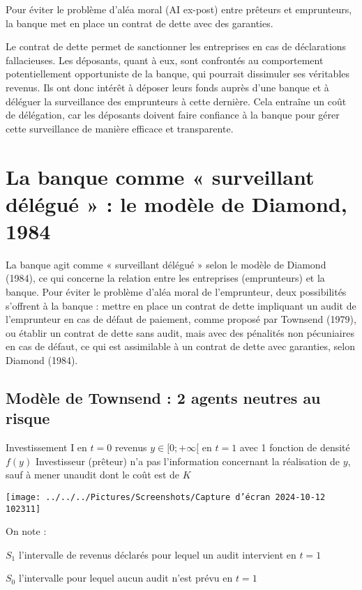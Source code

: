 \documentclass[a4paper, 12pt]{report}
\begin{document}
Pour éviter le problème d'aléa moral (AI ex-post) entre prêteurs et emprunteurs, la banque met en place un contrat de dette avec des garanties.

Le contrat de dette permet de sanctionner les entreprises en cas de déclarations fallacieuses. Les déposants, quant à eux, sont confrontés au comportement potentiellement opportuniste de la banque, qui pourrait dissimuler ses véritables revenus. Ils ont donc intérêt à déposer leurs fonds auprès d'une banque et à déléguer la surveillance des emprunteurs à cette dernière. Cela entraîne un coût de délégation, car les déposants doivent faire confiance à la banque pour gérer cette surveillance de manière efficace et transparente.

\section{La banque comme « surveillant délégué » : le modèle de Diamond, 1984}

La banque agit comme « surveillant délégué » selon le modèle de Diamond (1984), ce qui concerne la relation entre les entreprises (emprunteurs) et la banque. Pour éviter le problème d’aléa moral de l’emprunteur, deux possibilités s'offrent à la banque : mettre en place un contrat de dette impliquant un audit de l’emprunteur en cas de défaut de paiement, comme proposé par Townsend (1979), ou établir un contrat de dette sans audit, mais avec des pénalités non pécuniaires en cas de défaut, ce qui est assimilable à un contrat de dette avec garanties, selon Diamond (1984).

\subsection{Modèle de Townsend : 2 agents neutres au risque}

Investissement I en $t = 0$ revenus $y \in [0;+\infty[$ en $t=1$ avec 1 fonction de densité $f(y)$ Investisseur (prêteur) n’a pas l’information
concernant la réalisation de $y$, sauf à mener unaudit dont le coût est de $K$
\begin{center}
	\texttt{[image: ../../../Pictures/Screenshots/Capture d'écran 2024-10-12 102311]}
\end{center}
On note :

$S_1$ l’intervalle de revenus déclarés pour lequel un audit intervient en $t = 1$

$S_0$ l’intervalle pour lequel aucun audit n’est prévu en $t = 1$
\end{document}
